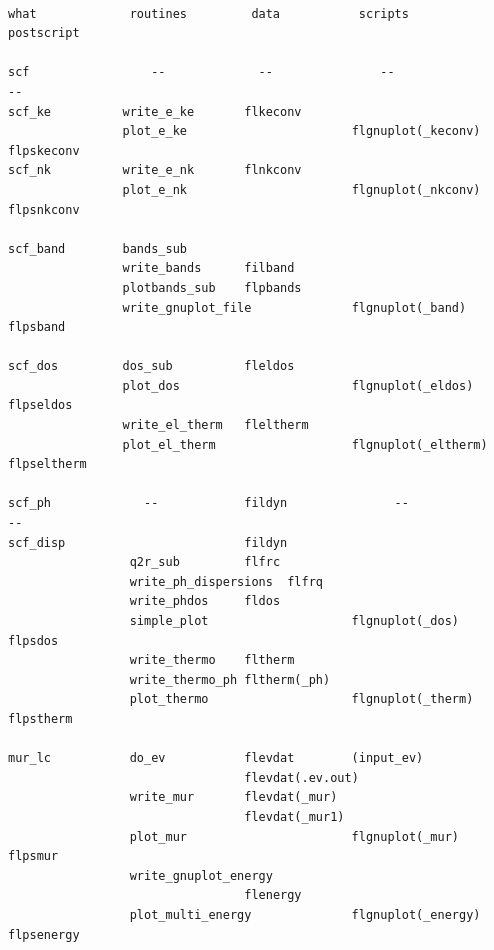 \documentclass[12pt,a4paper]{article}
\begin{document}
\begin{verbatim}

what             routines         data           scripts            postscript

scf                 --             --               --                 --
scf_ke          write_e_ke       flkeconv
                plot_e_ke                       flgnuplot(_keconv)  flpskeconv
scf_nk          write_e_nk       flnkconv
                plot_e_nk                       flgnuplot(_nkconv)  flpsnkconv

scf_band        bands_sub
                write_bands      filband
                plotbands_sub    flpbands
                write_gnuplot_file              flgnuplot(_band)    flpsband     

scf_dos         dos_sub          fleldos
                plot_dos                        flgnuplot(_eldos)   flpseldos
                write_el_therm   fleltherm
                plot_el_therm                   flgnuplot(_eltherm) flpseltherm

scf_ph             --            fildyn               --                  --
scf_disp                         fildyn
                 q2r_sub         flfrc
                 write_ph_dispersions  flfrq
                 write_phdos     fldos
                 simple_plot                    flgnuplot(_dos)     flpsdos
                 write_thermo    fltherm
                 write_thermo_ph fltherm(_ph)
                 plot_thermo                    flgnuplot(_therm)   flpstherm

mur_lc           do_ev           flevdat        (input_ev)
                                 flevdat(.ev.out)
                 write_mur       flevdat(_mur)
                                 flevdat(_mur1)
                 plot_mur                       flgnuplot(_mur)     flpsmur
                 write_gnuplot_energy
                                 flenergy
                 plot_multi_energy              flgnuplot(_energy)  flpsenergy


\end{verbatim}
\end{document}

